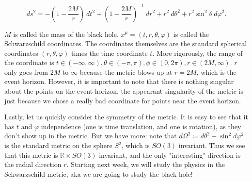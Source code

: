 \documentclass[10pt]{article}
\begin{document}
$$d s^2 = -(1-\frac{2M}{r}) \ dt^2 + (1- \frac{2M}{r})^{-1}\  dr^2 + r^2 \ d\theta^2  + r^2 \sin^2 \theta \  d\varphi^2.
$$



$M$ is called the mass of the black hole. $x^\mu = ( t,r,\theta, \varphi)$ is called the Schwarzschild coordinates. The coordinates themselves are the standard spherical coordinates $(r, \theta, \varphi)$ times the time coordinate $t$.  More rigorously, the range of the coordinate is $ t \in (-\infty, \infty), \theta \in (-\pi, \pi), \phi \in (0, 2\pi), r \in (2M, \infty)$. $r$ only goes from $2M$ to $\infty$ because the metric blows up at $r = 2M$, which is the event horizon. However, it is important to note that there is nothing singular about the points on the event horizon, the appearant singularity of the metric is just because we chose a really bad coordinate for points near the event horizon.

Lastly, let us quickly consider the symmetry of the metric. It is easy to see that it has $t$ and $\varphi$ independence (one is time translation, and one is rotation), as they don't show up in the metric. But we have more: note that $d\Omega^2 \coloneqq d\theta^2 + \sin^2 d\varphi^2$ is the standard metric on the sphere $S^2$, which is $SO(3)$ invariant. Thus we see that this metric is $\mathbb{R} \times SO(3)$ invariant, and the only "interesting" direction is the radial direction $r$. Starting next week, we will study the physics in the Schwarzschild metric, aka we are going to study the black hole!
\end{document}
